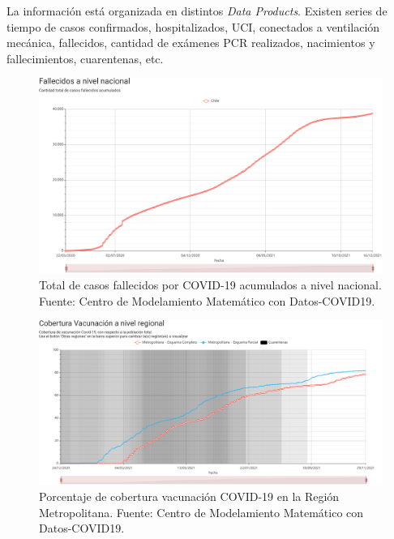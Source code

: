 La información está organizada en distintos \textit{Data Products}. Existen series de tiempo de casos confirmados, hospitalizados, UCI, conectados a ventilación mecánica, fallecidos, cantidad de exámenes PCR realizados, nacimientos y fallecimientos, cuarentenas, etc. 

\begin{figure}[h]
\centering
\includegraphics[width=\textwidth]{img/metodologia/datos/fallecidos_nacional.png}
\caption{Total de casos fallecidos por COVID-19 acumulados a nivel nacional. Fuente: Centro de Modelamiento Matemático  con Datos-COVID19.}
\label{img:cmm-fallecidos}
\end{figure}

\begin{figure}[h]
\centering
\includegraphics[width=\textwidth]{img/metodologia/datos/CoberturaVacunacionRM.png}
\caption{Porcentaje de cobertura vacunación COVID-19 en la Región Metropolitana. Fuente: Centro de Modelamiento Matemático con Datos-COVID19.}
\label{img:cmm-vacunados}
\end{figure}


